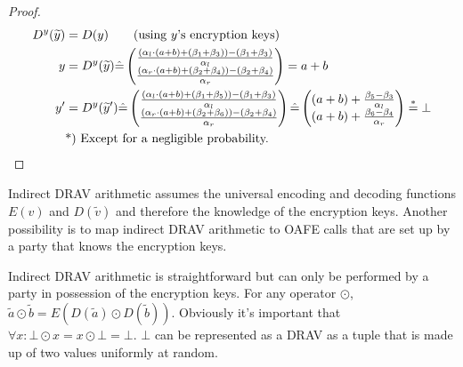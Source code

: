 \begin{proof}
  \begin{align*}
    D^y(\widetilde{y}) &= D(y) \qquad\text{(using $y$'s encryption keys)}\\
    y &= D^y(\widetilde{y}) \hat{=}
    \begin{pmatrix}
      \frac{(\alpha_l \cdot (a+b) + (\beta_1 + \beta_3)) - (\beta_1+\beta_3)}
           {\alpha_l}\\
      \frac{(\alpha_r \cdot (a+b) + (\beta_2 + \beta_4)) - (\beta_2+\beta_4)}
           {\alpha_r}\\
    \end{pmatrix}
    = a+b\\
    y' &= D^y(\widetilde{y}')
    \hat{=}
    \begin{pmatrix}
      \frac{(\alpha_l \cdot (a+b) + (\beta_1 + \beta_5)) - (\beta_1+\beta_3)}
           {\alpha_l}\\
      \frac{(\alpha_r \cdot (a+b) + (\beta_2 + \beta_6)) - (\beta_2+\beta_4)}
           {\alpha_r}\\
    \end{pmatrix}
    \hat{=}
    \begin{pmatrix}
      (a+b) +
      \frac{\beta_5 - \beta_3}{\alpha_l}\\
      (a+b) +
      \frac{\beta_6 - \beta_4}{\alpha_r}\\
    \end{pmatrix}
    \stackrel{*}{=} \bot\\
    &\text{*) Except for a negligible probability.}{}
  \end{align*}
\end{proof}


\label{sec:indirect-DRAV-arithmetic}

Indirect DRAV arithmetic assumes the universal encoding and decoding functions
$E(v)$ and $D(\widetilde{v})$ and therefore the knowledge of the encryption
keys. Another possibility is to map indirect DRAV arithmetic to OAFE calls that
are set up by a party that knows the encryption keys.

Indirect DRAV arithmetic is straightforward but can only be performed by a party
in possession of the encryption keys. For any operator $\odot$, $\widetilde{a}
\odot \widetilde{b} = E(D(\widetilde{a}) \odot D(\widetilde{b}))$. Obviously
it's important that $\forall x: \bot \odot x = x \odot \bot = \bot$. $\bot$ can
be represented as a DRAV as a tuple that is made up of two values uniformly at
random.

